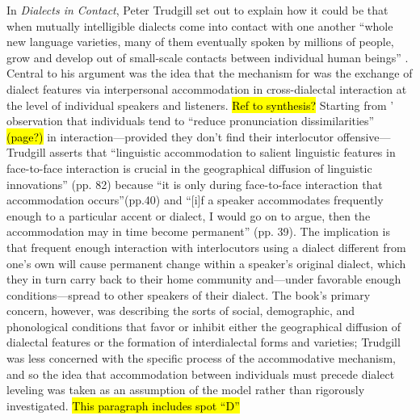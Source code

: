     In \textit{Dialects in Contact}, Peter Trudgill set out to explain how it could be that when mutually intelligible dialects come into contact with one another ``whole new language varieties, many of them eventually spoken by millions of people, grow and develop out of small-scale contacts between individual human beings'' \citep[p.161]{trudgill1986dialects}. Central to his argument was the idea that the mechanism for \cidc{} was the exchange of dialect features via interpersonal accommodation in cross-dialectal interaction at the level of individual speakers and listeners. \hl{Ref to synthesis?} Starting from \citeauthor{giles1973accent}' observation that individuals tend to ``reduce pronunciation dissimilarities'' \hl{(page?)} in interaction---provided they don't find their interlocutor offensive---Trudgill asserts that ``linguistic accommodation to salient linguistic features in face-to-face interaction is crucial in the geographical diffusion of linguistic innovations'' (pp. 82) because ``it is only during face-to-face interaction that accommodation occurs''(pp.40) and ``[i]f a speaker accommodates frequently enough to a particular accent or dialect, I would go on to argue, then the accommodation may in time become permanent'' (pp. 39). The implication is that frequent enough interaction with interlocutors using a dialect different from one's own will cause permanent change within a speaker's original dialect, which they in turn carry back to their home community and---under favorable enough conditions---spread to other speakers of their dialect. The book's primary concern, however, was describing the sorts of social, demographic, and phonological conditions that favor or inhibit either the geographical diffusion of dialectal features or the formation of interdialectal forms and varieties; Trudgill was less concerned with the specific process of the accommodative mechanism, and so the idea that accommodation between individuals must precede dialect leveling was taken as an assumption of the model rather than rigorously investigated. \hl{This paragraph includes spot ``D''}
    
